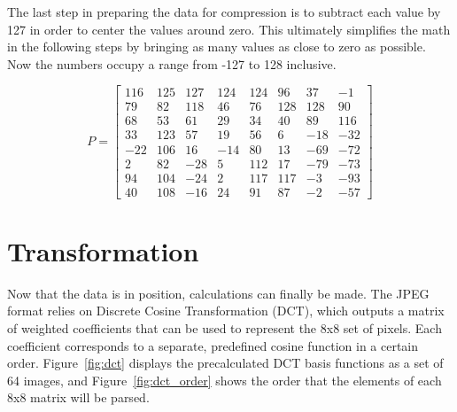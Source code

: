 \documentclass[11pt]{article}
\begin{document}
The last step in preparing the data for compression is to subtract each value by 127 in order to center the values around zero.
This ultimately simplifies the math in the following steps by bringing as many values as close to zero as possible.
Now the numbers occupy a range from -127 to 128 inclusive.

\begin{equation}
  \label{eqn:centered}
  P = \begin{bmatrix}
    116 & 125 & 127 & 124 & 124 & 96  & 37  & -1  \\
    79  & 82  & 118 & 46  & 76  & 128 & 128 & 90  \\
    68  & 53  & 61  & 29  & 34  & 40  & 89  & 116 \\
    33  & 123 & 57  & 19  & 56  & 6   & -18 & -32 \\
    -22 & 106 & 16  & -14 & 80  & 13  & -69 & -72 \\
    2   & 82  & -28 & 5   & 112 & 17  & -79 & -73 \\
    94  & 104 & -24 & 2   & 117 & 117 & -3  & -93 \\
    40  & 108 & -16 & 24  & 91  & 87  & -2  & -57
  \end{bmatrix}
\end{equation}

\section{Transformation}
\label{sec: transformation}

Now that the data is in position, calculations can finally be made.
The JPEG format relies on Discrete Cosine Transformation (DCT), which outputs a matrix of weighted coefficients that can be used to represent the 8x8 set of pixels.
Each coefficient corresponds to a separate, predefined cosine function in a certain order.
Figure~\ref{fig:dct} displays the precalculated DCT basis functions as a set of 64 images, and Figure~\ref{fig:dct_order} shows the order that the elements of each 8x8 matrix will be parsed.
\end{document}
